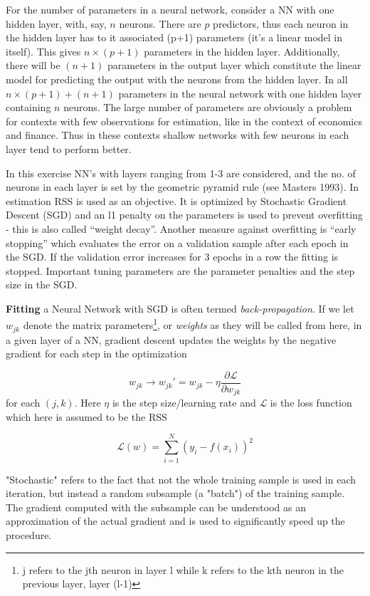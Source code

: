 \documentclass[11pt]{article}
\let\rmarkdownfootnote\footnote%
\def\footnote{\protect\rmarkdownfootnote}
\begin{document}
For the number of parameters in a neural network, consider a NN with one
hidden layer, with, say, \(n\) neurons. There are \(p\) predictors, thus
each neuron in the hidden layer has to it associated (p+1) parameters
(it's a linear model in itself). This gives \(n \times(p+1)\) parameters
in the hidden layer. Additionally, there will be \((n+1)\) parameters in
the output layer which constitute the linear model for predicting the
output with the neurons from the hidden layer. In all
\(n \times(p+1) + (n+1)\) parameters in the neural network with one
hidden layer containing \(n\) neurons. The large number of parameters
are obviously a problem for contexts with few observations for
estimation, like in the context of economics and finance. Thus in these
contexts shallow networks with few neurons in each layer tend to perform
better.

In this exercise NN's with layers ranging from 1-3 are considered, and
the no. of neurons in each layer is set by the geometric pyramid rule
(see Masters 1993). In estimation RSS is used as an objective. It is
optimized by Stochastic Gradient Descent (SGD) and an l1 penalty on the
parameters is used to prevent overfitting - this is also called ``weight
decay''. Another measure against overfitting is ``early stopping'' which
evaluates the error on a validation sample after each epoch in the SGD. If
the validation error increases for 3 epochs in a row the fitting is
stopped. Important tuning parameters are the parameter penalties and the
step size in the SGD.

\textbf{Fitting} a Neural Network with SGD is often termed \emph{back-propagation}. If we let \(w_{jk}\) denote the matrix parameters\footnote{j refers to the jth neuron in layer l while k refers to the kth neuron in the previous layer, layer (l-1)}, or \emph{weights} as they will be called from here, in a given layer of a NN, gradient descent updates the weights by the negative gradient for each step in the optimization

\[
  w_{jk} \rightarrow w_{jk}' = w_{jk} - \eta \frac{\partial \mathcal{L}}{\partial w_{jk}}
\]
for each \((j,k)\). Here \(\eta \) is the step size/learning rate and \(\mathcal{L}\) is the loss function which here is assumed to be the RSS

\[
  \mathcal{L}(w) = \sum_{i=1}^N (y_i - f(x_i))^2
\]

"Stochastic" refers to the fact that not the whole training sample is used in each iteration, but instead a random subsample (a "batch") of the training sample. The gradient computed with the subsample can be understood as an approximation of the actual gradient and is used to significantly speed up the procedure.
\end{document}
